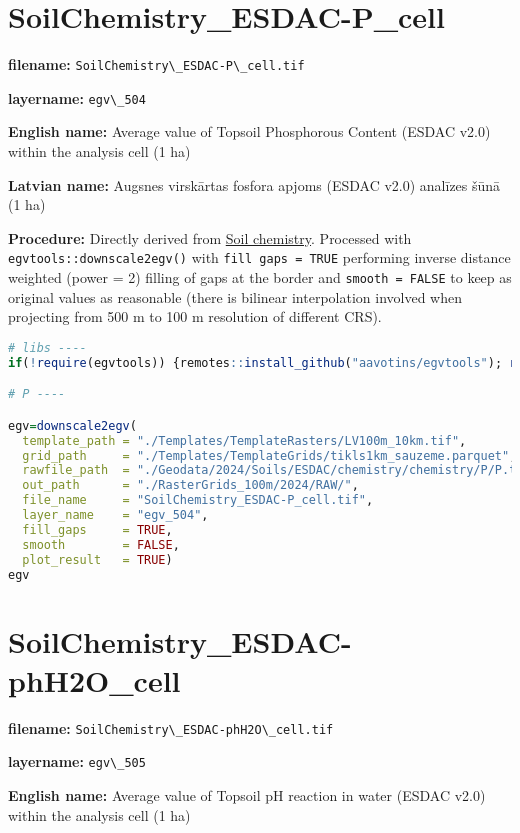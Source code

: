\documentclass[
]{book}
\newcommand{\passthrough}[1]{#1}
\begin{document}
\section{SoilChemistry\_ESDAC-P\_cell}\label{ch06.504}

\textbf{filename:} \passthrough{\lstinline!SoilChemistry\_ESDAC-P\_cell.tif!}

\textbf{layername:} \passthrough{\lstinline!egv\_504!}

\textbf{English name:} Average value of Topsoil Phosphorous Content (ESDAC v2.0) within the analysis cell (1 ha)

\textbf{Latvian name:} Augsnes virskārtas fosfora apjoms (ESDAC v2.0) analīzes šūnā (1 ha)

\textbf{Procedure:} Directly derived from \hyperref[Ch04.07.01]{Soil chemistry}. Processed
with \passthrough{\lstinline!egvtools::downscale2egv()!} with \passthrough{\lstinline!fill gaps = TRUE!} performing inverse
distance weighted (power = 2) filling of gaps at the border and \passthrough{\lstinline!smooth = FALSE!}
to keep as original values as reasonable (there is bilinear interpolation
involved when projecting from 500 m to 100 m resolution of different CRS).

\begin{lstlisting}[language=R]
# libs ----
if(!require(egvtools)) {remotes::install_github("aavotins/egvtools"); require(egvtools)}

# P ----

egv=downscale2egv(
  template_path = "./Templates/TemplateRasters/LV100m_10km.tif",
  grid_path     = "./Templates/TemplateGrids/tikls1km_sauzeme.parquet",
  rawfile_path  = "./Geodata/2024/Soils/ESDAC/chemistry/chemistry/P/P.tif",
  out_path      = "./RasterGrids_100m/2024/RAW/",
  file_name     = "SoilChemistry_ESDAC-P_cell.tif",
  layer_name    = "egv_504",
  fill_gaps     = TRUE,
  smooth        = FALSE,
  plot_result   = TRUE)
egv
\end{lstlisting}

\section{SoilChemistry\_ESDAC-phH2O\_cell}\label{ch06.505}

\textbf{filename:} \passthrough{\lstinline!SoilChemistry\_ESDAC-phH2O\_cell.tif!}

\textbf{layername:} \passthrough{\lstinline!egv\_505!}

\textbf{English name:} Average value of Topsoil pH reaction in water (ESDAC v2.0) within the analysis cell (1 ha)
\end{document}
